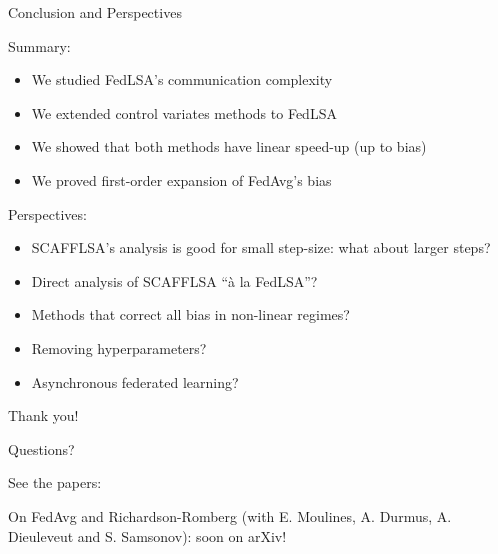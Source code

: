 \documentclass[aspectratio=169,14pt]{beamer}
\begin{document}
  \begin{frame}{Conclusion and Perspectives}

    \vspace{-1em}
        
    Summary:

    \vspace{-0.5em}

    \begin{itemize}
    \small      
    \item We studied FedLSA's communication complexity
    \item We extended control variates methods to FedLSA
    \item We showed that both methods have linear speed-up (up to bias)
    \item We proved first-order expansion of FedAvg's bias
    \end{itemize}

    Perspectives:

    \vspace{-0.5em}
    
    \begin{itemize}
    \small
    \item SCAFFLSA's analysis is good for small step-size: what about larger steps?
    \item Direct analysis of SCAFFLSA ``à la FedLSA''?
    \item Methods that correct all bias in non-linear regimes?
    \item Removing hyperparameters?
    \item Asynchronous federated learning?
    \end{itemize}
  \end{frame}

  \begin{frame}
    \begin{center}
      \LARGE Thank you!

      \normalsize Questions?
    \end{center}
    

    \small
    See the papers:


    On FedAvg and Richardson-Romberg (with \textcolor{beamer@blendedblue}{E. Moulines, A. Durmus, A. Dieuleveut and S. Samsonov}): soon on arXiv!
  \end{frame}
\end{document}
